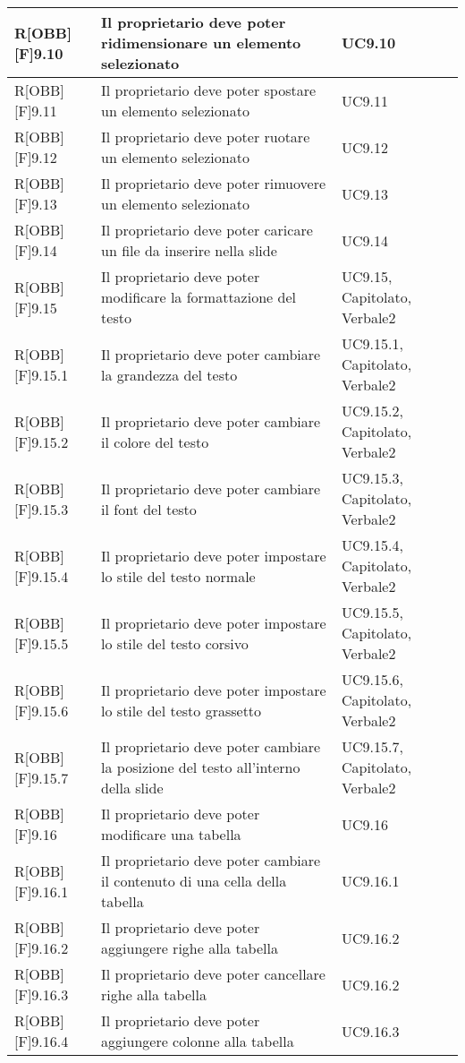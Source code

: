 	\begin{table}[h]
		\begin{tabular}{|p{}|p{}|p{}|}
			\midrule
			
			R[OBB][F]9.10 & Il proprietario deve poter ridimensionare un elemento selezionato & UC9.10 \\ \midrule
			R[OBB][F]9.11 & Il proprietario deve poter spostare un elemento selezionato & UC9.11 \\ \midrule
			R[OBB][F]9.12 & Il proprietario deve poter ruotare un elemento selezionato & UC9.12 \\ \midrule
			R[OBB][F]9.13 & Il proprietario deve poter rimuovere un elemento selezionato & UC9.13 \\ \midrule
			R[OBB][F]9.14 & Il proprietario deve poter caricare un file da inserire nella \gls{slide} & UC9.14 \\ \midrule
			R[OBB][F]9.15 & Il proprietario deve poter modificare la formattazione del testo & UC9.15, Capitolato, Verbale2 \\ \midrule
			R[OBB][F]9.15.1 & Il proprietario deve poter cambiare la grandezza del testo & UC9.15.1, Capitolato, Verbale2 \\ \midrule
			R[OBB][F]9.15.2 & Il proprietario deve poter cambiare il colore del testo & UC9.15.2, Capitolato, Verbale2 \\ \midrule
			R[OBB][F]9.15.3 & Il proprietario deve poter cambiare il \gls{font} del testo & UC9.15.3, Capitolato, Verbale2 \\ \midrule
			R[OBB][F]9.15.4 & Il proprietario deve poter impostare lo stile del testo normale & UC9.15.4, Capitolato, Verbale2 \\ \midrule
			R[OBB][F]9.15.5 & Il proprietario deve poter impostare lo stile del testo corsivo & UC9.15.5, Capitolato, Verbale2 \\ \midrule
			R[OBB][F]9.15.6 & Il proprietario deve poter impostare lo stile del testo grassetto & UC9.15.6, Capitolato, Verbale2 \\ \midrule
			R[OBB][F]9.15.7 & Il proprietario deve poter cambiare la posizione del testo all'interno della \gls{slide} & UC9.15.7, Capitolato, Verbale2 \\ \midrule
			R[OBB][F]9.16 & Il proprietario deve poter modificare una tabella & UC9.16 \\ \midrule
			R[OBB][F]9.16.1 & Il proprietario deve poter cambiare il contenuto di una cella della tabella & UC9.16.1 \\ \midrule
			R[OBB][F]9.16.2 & Il proprietario deve poter aggiungere righe alla tabella & UC9.16.2 \\ \midrule
			R[OBB][F]9.16.3 & Il proprietario deve poter cancellare righe alla tabella & UC9.16.2 \\ \midrule
			R[OBB][F]9.16.4 & Il proprietario deve poter aggiungere colonne alla tabella & UC9.16.3 \\ \midrule

		\end{tabular}
	\end{table}
	\newpage
	
